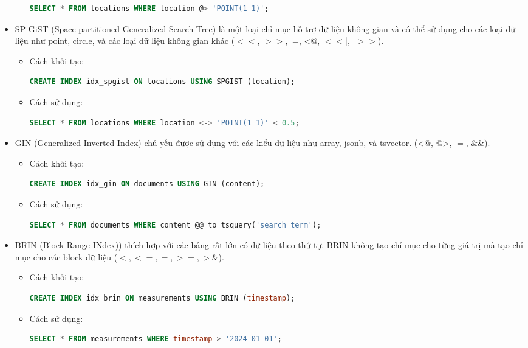 \begin{itemize}
\begin{itemize}
\begin{lstlisting}[language=SQL]
SELECT * FROM locations WHERE location @> 'POINT(1 1)';
\end{lstlisting}
        \end{itemize}
    \item SP-GiST (Space-partitioned Generalized Search Tree) là một loại chỉ mục hỗ trợ dữ liệu không gian và có thể sử dụng cho các loại dữ liệu như point, circle, và các loại dữ liệu không gian khác ($<<$,   $>>$,   $~$=,    <@,   $<<$|,   |$>>$).
        \begin{itemize}
            \item Cách khởi tạo:
\begin{lstlisting}[language=SQL]
CREATE INDEX idx_spgist ON locations USING SPGIST (location);
\end{lstlisting}
            \item Cách sử dụng:
\begin{lstlisting}[language=SQL]
SELECT * FROM locations WHERE location <-> 'POINT(1 1)' < 0.5;
\end{lstlisting}
        \end{itemize}
    \item GIN (Generalized Inverted Index) chủ yếu được sử dụng với các kiểu dữ liệu như array, jsonb, và tsvector. (<@,   @>,   $=$,   \&\&).
        \begin{itemize}
            \item Cách khởi tạo:
\begin{lstlisting}[language=SQL]
CREATE INDEX idx_gin ON documents USING GIN (content);
\end{lstlisting}
            \item Cách sử dụng:
\begin{lstlisting}[language=SQL]
SELECT * FROM documents WHERE content @@ to_tsquery('search_term');
\end{lstlisting}
        \end{itemize}
    \item BRIN (Block Range INdex)) thích hợp với các bảng rất lớn có dữ liệu theo thứ tự. BRIN không tạo chỉ mục cho từng giá trị mà tạo chỉ mục cho các block dữ liệu ($<,   <=,   =,   >=,   >\&$).
        \begin{itemize}
            \item Cách khởi tạo:
\begin{lstlisting}[language=SQL]
CREATE INDEX idx_brin ON measurements USING BRIN (timestamp);
\end{lstlisting}
            \item Cách sử dụng:
\begin{lstlisting}[language=SQL]
SELECT * FROM measurements WHERE timestamp > '2024-01-01';
\end{lstlisting}
        \end{itemize}
\end{itemize}
 
